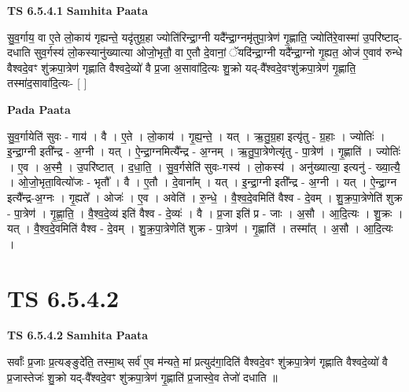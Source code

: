 \documentclass[17pt]{extarticle}
\begin{document}
\textbf{TS 6.5.4.1 } \newline
\textbf{Samhita Paata} \newline

सु॒व॒र्गाय॒ वा ए॒ते लो॒काय॑ गृह्यन्ते॒ यदृ॑तुग्र॒हा ज्योति॑रिन्द्रा॒ग्नी यदै᳚न्द्रा॒ग्नमृ॑तुपा॒त्रेण॑ गृ॒ह्णाति॒ ज्योति॑रे॒वास्मा॑ उ॒परि॑ष्टाद्-दधाति सुव॒र्गस्य॑ लो॒कस्यानु॑ख्यात्या ओजो॒भृतौ॒ वा ए॒तौ दे॒वानां॒ ॅयदि॑न्द्रा॒ग्नी यदै᳚न्द्रा॒ग्नो गृ॒ह्यत॒ ओज॑ ए॒वाव॑ रुन्धे वैश्वदे॒वꣳ शु॑क्रपा॒त्रेण॑ गृह्णाति वैश्वदे॒व्यो॑ वै प्र॒जा अ॒सावा॑दि॒त्यः शु॒क्रो यद्-वै᳚श्वदे॒वꣳशु॑क्रपा॒त्रेण॑ गृ॒ह्णाति॒ तस्मा॑द॒सावा॑दि॒त्यः- [  ] \newline

\textbf{Pada Paata} \newline

सु॒व॒र्गायेति॑ सुवः - गाय॑ । वै । ए॒ते । लो॒काय॑ । गृ॒ह्य॒न्ते॒ । यत् । ऋ॒तु॒ग्र॒हा इत्यृ॑तु - ग्र॒हाः । ज्योतिः॑ । इ॒न्द्रा॒ग्नी इती᳚न्द्र - अ॒ग्नी । यत् । ऐ॒न्द्रा॒ग्नमित्यै᳚न्द्र - अ॒ग्नम् । ऋ॒तु॒पा॒त्रेणेत्यृ॑तु - पा॒त्रेण॑ । गृ॒ह्णाति॑ । ज्योतिः॑ । ए॒व । अ॒स्मै॒ । उ॒परि॑ष्टात् । द॒धा॒ति॒ । सु॒व॒र्गसेति॑ सुवः-गस्य॑ । लो॒कस्य॑ । अनु॑ख्यात्या॒ इत्यनु॑ - ख्या॒त्यै॒ । ओ॒जो॒भृता॒वित्यो॑जः - भृतौ᳚ । वै । ए॒तौ । दे॒वाना᳚म् । यत् । इ॒न्द्रा॒ग्नी इती᳚न्द्र - अ॒ग्नी । यत् । ऐ॒न्द्रा॒ग्न इत्यै᳚न्द्र-अ॒ग्नः । गृ॒ह्यते᳚ । ओजः॑ । ए॒व । अवेति॑ । रु॒न्धे॒ । वै॒श्व॒दे॒वमिति॑ वैश्व - दे॒वम् । शु॒क्र॒पा॒त्रेणेति॑ शुक्र - पा॒त्रेण॑ । गृ॒ह्णा॒ति॒ । वै॒श्व॒दे॒व्य॑ इति॑ वैश्व - दे॒व्यः॑ । वै । प्र॒जा इति॑ प्र - जाः । अ॒सौ । आ॒दि॒त्यः । शु॒क्रः । यत् । वै॒श्व॒दे॒वमिति॑ वैश्व - दे॒वम् । शु॒क्र॒पा॒त्रेणेति॑ शुक्र - पा॒त्रेण॑ । गृ॒ह्णाति॑ । तस्मा᳚त् । अ॒सौ । आ॒दि॒त्यः ।  \newline




\section*{ TS 6.5.4.2 }

\textbf{TS 6.5.4.2 } \newline
\textbf{Samhita Paata} \newline

सर्वाः᳚ प्र॒जाः प्र॒त्यङ्ङुदे॑ति॒ तस्मा॒थ् सर्व॑ ए॒व म॑न्यते॒ मां प्रत्युद॑गा॒दिति॑ वैश्वदे॒वꣳ शु॑क्रपा॒त्रेण॑ गृह्णाति वैश्वदे॒व्यो॑ वै प्र॒जास्तेजः॑ शु॒क्रो यद्-वै᳚श्वदे॒वꣳ शु॑क्रपा॒त्रेण॑ गृ॒ह्णाति॑ प्र॒जास्वे॒व तेजो॑ दधाति ॥ \newline
\end{document}
